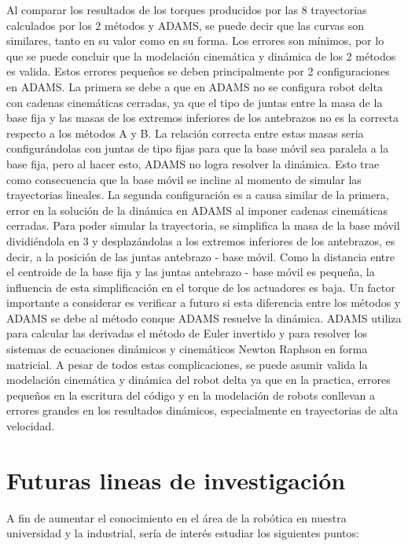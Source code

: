 \begin{itemize}
{            Al comparar los resultados de los torques producidos por las 8 trayectorias calculados por los 2 métodos y ADAMS, se puede decir que las curvas son similares, tanto en su valor como en su forma. Los errores son mínimos, por lo que se puede concluir que la modelación cinemática y dinámica de los 2 métodos es valida. Estos errores pequeños se deben principalmente por 2 configuraciones en ADAMS. La primera se debe a que en ADAMS no se configura robot delta con cadenas cinemáticas cerradas, ya que el tipo de juntas entre la masa de la base fija y las masas de los extremos inferiores de los antebrazos no es la correcta respecto a los métodos A y B. La relación correcta entre estas masas seria configurándolas con juntas de tipo fijas para que la base móvil sea paralela a la base fija, pero al hacer esto,  ADAMS no logra resolver la dinámica. Esto trae como consecuencia que la base móvil se incline al momento de simular las trayectorias lineales. La segunda configuración es a causa similar de la primera, error en la solución de la dinámica en ADAMS al imponer cadenas cinemáticas cerradas. Para poder simular la trayectoria, se simplifica la masa de la base móvil dividiéndola en 3 y desplazándolas a los extremos inferiores de los antebrazos, es decir, a la posición de las juntas antebrazo - base móvil. Como la distancia entre el centroide de la base fija y las juntas antebrazo - base móvil es pequeña, la influencia de esta simplificación en el torque de los actuadores es baja. Un factor importante a considerar es verificar a futuro si esta diferencia entre los métodos y ADAMS se debe al método conque ADAMS resuelve la dinámica. ADAMS utiliza para calcular las derivadas el método de Euler invertido y para resolver los sistemas de ecuaciones dinámicos y cinemáticos Newton Raphson en forma matricial. A pesar de todos estas complicaciones, se puede asumir valida la modelación cinemática y dinámica del robot delta ya que en la practica, errores pequeños en la escritura del código y en la modelación de robots conllevan a errores grandes en los resultados dinámicos, especialmente en trayectorias de alta velocidad. 
            

 
            
            
            
            }
        \end{itemize}


\newpage

\section{Futuras lineas de investigación}
A fin de aumentar el conocimiento en el área de la robótica en nuestra universidad y la industrial, sería de interés estudiar los siguientes puntos:

